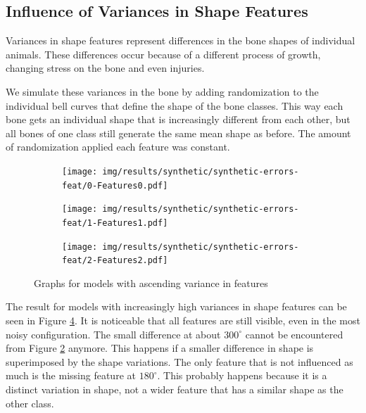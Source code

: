 \documentclass[pdftex,12pt,a4paper]{report}
\begin{document}
\subsection{Influence of Variances in Shape Features}
\label{sub:synthetic-variances}

Variances in shape features represent differences in the bone shapes of individual animals. These differences occur because of a different process of growth, changing stress on the bone and even injuries.

We simulate these variances in the bone by adding randomization to the individual bell curves that define the shape of the bone classes. This way each bone gets an individual shape that is increasingly different from each other, but all bones of one class still generate the same mean shape as before. The amount of randomization applied each feature was constant.

\begin{figure}[h]
	\centering
	\begin{subfigure}[b]{0.32\textwidth}
		\centering
		\texttt{[image: img/results/synthetic/synthetic-errors-feat/0-Features0.pdf]}
		\label{fig:results-synthetic-features-0}
	\end{subfigure}
	\begin{subfigure}[b]{0.32\textwidth}
		\centering
		\texttt{[image: img/results/synthetic/synthetic-errors-feat/1-Features1.pdf]}
		\label{fig:results-synthetic-features-1}
	\end{subfigure}
	\begin{subfigure}[b]{0.32\textwidth}
		\centering
		\texttt{[image: img/results/synthetic/synthetic-errors-feat/2-Features2.pdf]}
		\label{fig:results-synthetic-features-2}
	\end{subfigure}
	\caption{Graphs for models with ascending variance in features}
	\label{fig:ascending-variance}
\end{figure}

The result for models with increasingly high variances in shape features can be seen in Figure \ref{fig:ascending-variance}. It is noticeable that all features are still visible, even in the most noisy configuration. The small difference at about $300^\circ$ cannot be encountered from Figure \ref{fig:results-synthetic-features-1} anymore. This happens if a smaller difference in shape is superimposed by the shape variations. The only feature that is not influenced as much is the missing feature at $180^\circ$. This probably happens because it is a distinct variation in shape, not a wider feature that has a similar shape as the other class.
\end{document}
